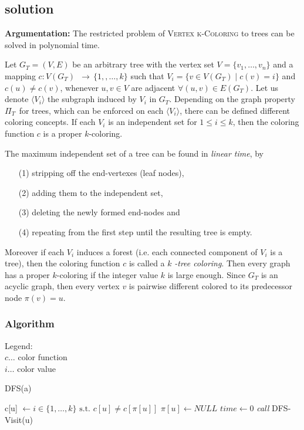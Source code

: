 \subsection{solution}
\textbf{Argumentation:}
The restricted problem of \textsc{Vertex k-Coloring} to trees can be
solved in polynomial time.

Let $G_{T}=(V,E)$ be an arbitrary tree with the vertex set $V=\{v_{1},\ldots
,v_{n}\}$ and a mapping $c:V(G_{T})\,$ $\longrightarrow \,\{1,,\ldots ,k\}$
such that $V_{i}=\{v\in V(G_{T})\mid c(v)=i\}$ and $c(u)\neq c(v)$, whenever 
$u,v\in V$ are adjacent $\forall (u,v)\in E(G_{T})$. Let us denote $\langle
V_{i}\rangle $ the subgraph induced by $V_{i}$ in $G_{T}$. Depending on the
graph property $\Pi _{T\text{ }}$for trees, which can be enforced on each $%
\langle V_{i}\rangle $, there can be defined different coloring concepts. If
each $V_{i}$ is an independent set for $1\leq i\leq k$, then the coloring
function $c$ is a proper $k$-coloring.

The maximum independent set of a tree can be found in \textit{linear time},
by
\begin{enumerate}
\item[(1)] stripping off the end-vertexes (leaf nodes),
\item[(2)] adding them to the independent set,
\item[(3)] deleting the newly formed end-nodes and
\item[(4)] repeating from the first step until the resulting tree is empty.
\end{enumerate}
Moreover if each $V_{i}$ induces a forest (i.e. each connected component of $%
V_{i}$ is a tree), then the coloring function $c$ is called a $k$\textit{%
-tree coloring}. Then every graph has a proper $k$-coloring if the integer
value $k$ is large enough. Since $G_{T}$ is an acyclic graph, then every
vertex $v$ is pairwise different colored to its predecessor node $\pi (v)=u$.

\bigskip

\renewcommand{\algorithmicforall}{\textbf{for each}}
\subsubsection{Algorithm}
\textrm{Legend:}\\
$c \ldots$ color function\\
$i \ldots$ color value\\
\begin{algorithm}[ht]
\small
\caption{DFS(a)}
\begin{algorithmic}
      \STATE c[u] $\gets i \in \{1,\ldots,k\} \text{ s.t. } c[u] \neq c[\pi[u]]$
      \STATE $\pi[u] \gets NULL$
  \ENDFOR
  \STATE $time \gets 0$
      \STATE \textit{call} DFS-Visit(u)
    \ENDIF
  \ENDFOR
\end{algorithmic}
\end{algorithm}

